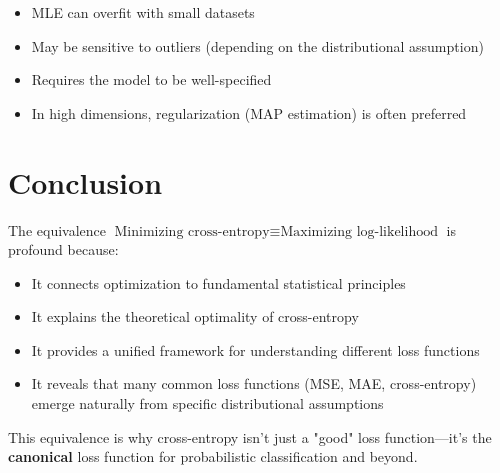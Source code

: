 \begin{notechapter}
\begin{itemize}
    \item MLE can overfit with small datasets
    \item May be sensitive to outliers (depending on the distributional assumption)
    \item Requires the model to be well-specified
    \item In high dimensions, regularization (MAP estimation) is often preferred
\end{itemize}

\section{Conclusion}

The equivalence $\text{Minimizing cross-entropy} \equiv \text{Maximizing log-likelihood}$ is profound because:

\begin{itemize}
    \item It connects optimization to fundamental statistical principles
    \item It explains the theoretical optimality of cross-entropy
    \item It provides a unified framework for understanding different loss functions
    \item It reveals that many common loss functions (MSE, MAE, cross-entropy) emerge naturally from specific distributional assumptions
\end{itemize}

This equivalence is why cross-entropy isn't just a "good" loss function—it's the \textbf{canonical} loss function for probabilistic classification and beyond.
\end{notechapter}

